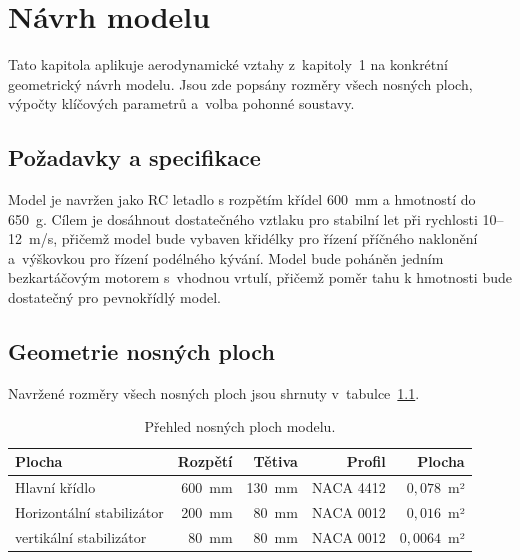 \documentclass[12pt, a4paper, oneside]{report}
\begin{document}
\chapter{Návrh modelu}
\label{kap:navrh}

Tato kapitola aplikuje aerodynamické vztahy z~kapitoly~1 na konkrétní geometrický
návrh modelu. Jsou zde popsány rozměry všech nosných ploch, výpočty klíčových
parametrů a~volba pohonné soustavy.

\section{Požadavky a specifikace}

Model je navržen jako RC letadlo s rozpětím křídel 600~mm a hmotností do 650~g.
Cílem je dosáhnout dostatečného vztlaku pro stabilní let při rychlosti 10--12~m/s, přičemž
model bude vybaven křidélky pro řízení příčného naklonění a~výškovkou pro řízení podélného kývání.
Model bude poháněn jedním bezkartáčovým motorem s~vhodnou vrtulí, přičemž poměr tahu k hmotnosti bude dostatečný pro pevnokřídlý model.

\section{Geometrie nosných ploch}

Navržené rozměry všech nosných ploch jsou shrnuty v~tabulce~\ref{tab:kridla}.

\begin{table}[H]
    \centering
    \caption{Přehled nosných ploch modelu.}
    \label{tab:kridla}
    \begin{tabular}{lrrrr}
        \toprule
        Plocha & Rozpětí & Tětiva & Profil & Plocha \\
        \midrule
        Hlavní křídlo        & 600~mm & 130~mm & NACA 4412 & $0{,}078$~m² \\
        Horizontální stabilizátor & 200~mm & 80~mm  & NACA 0012 & $0{,}016$~m² \\
        vertikální stabilizátor & 80~mm  & 80~mm  & NACA 0012 & $0{,}0064$~m² \\
        \bottomrule
    \end{tabular}
\end{table}
\end{document}
